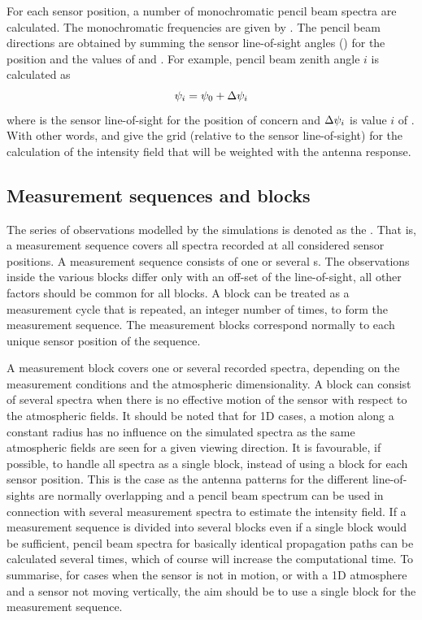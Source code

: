 For each sensor position, a number of monochromatic pencil beam
spectra are calculated. The monochromatic frequencies are given by
. The pencil
beam directions are obtained by summing the sensor line-of-sight
angles () for the position and the values of
 and . For
example, pencil beam zenith angle $i$ is calculated as
\begin{equation}
  \psi_{i} = \psi_{0} + \Delta\psi_{i}
  \label{eq:fm_defs:psi_grid}
\end{equation}
where  is the sensor line-of-sight for the position of
concern and $\Delta\psi_{i}$ is value $i$ of
.  With other words,
 and  give
the grid (relative to the sensor line-of-sight) for the calculation of
the intensity field that will be weighted with the antenna response.


\subsection{Measurement sequences and blocks}
\label{sec:fm_defs:seqsandblocks}

The series of observations modelled by the simulations is denoted as
the . That is, a measurement sequence
covers all spectra recorded at all considered sensor positions. A
measurement sequence consists of one or several s. The observations inside the various blocks differ only with
an off-set of the line-of-sight, all other factors should be common
for all blocks. A block can be treated as a measurement cycle that is
repeated, an integer number of times, to form the measurement
sequence.  The measurement blocks correspond normally to each unique
sensor position of the sequence.

A measurement block covers one or several recorded spectra, depending
on the measurement conditions and the atmospheric dimensionality. A
block can consist of several spectra when there is no effective motion
of the sensor with respect to the atmospheric fields. It should be
noted that for 1D cases, a motion along a constant radius has no
influence on the simulated spectra as the same atmospheric fields are
seen for a given viewing direction. It is favourable, if possible, to
handle all spectra as a single block, instead of using a block for
each sensor position. This is the case as the antenna patterns for the
different line-of-sights are normally overlapping and a pencil beam
spectrum can be used in connection with several measurement spectra to
estimate the intensity field. If a measurement sequence is divided
into several blocks even if a single block would be sufficient, pencil
beam spectra for basically identical propagation paths can be
calculated several times, which of course will increase the
computational time. To summarise, for cases when the sensor is not in
motion, or with a 1D atmosphere and a sensor not moving vertically,
the aim should be to use a single block for the measurement sequence.

